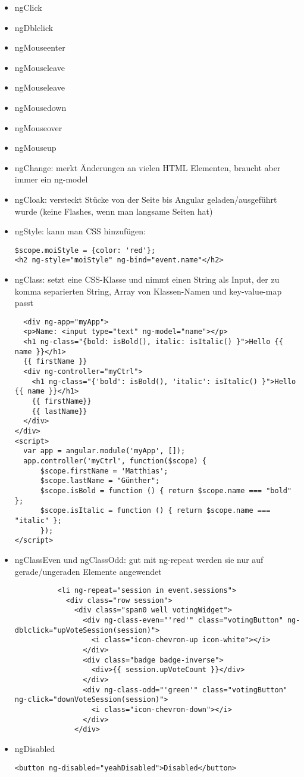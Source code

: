 \begin{itemize}
  \item ngClick
  \item ngDblclick
  \item ngMouseenter
  \item ngMouseleave
  \item ngMouseleave
  \item ngMousedown
  \item ngMouseover
  \item ngMouseup
  \item ngChange: merkt Änderungen an vielen HTML Elementen, braucht aber immer ein ng-model
  \item ngCloak: versteckt Stücke von der Seite bis Angular geladen/ausgeführt wurde (keine Flashes,
    wenn man langsame Seiten hat)
  \item ngStyle: kann man CSS hinzufügen:
    \begin{verbatim}
$scope.moiStyle = {color: 'red'};
<h2 ng-style="moiStyle" ng-bind="event.name"</h2>
    \end{verbatim}
  \item ngClass: setzt eine CSS-Klasse und nimmt einen String als Input, der zu komma separierten String, Array von Klassen-Namen  und key-value-map passt
  \begin{verbatim}
  <div ng-app="myApp">
  <p>Name: <input type="text" ng-model="name"></p>
  <h1 ng-class="{bold: isBold(), italic: isItalic() }">Hello {{ name }}</h1>
  {{ firstName }}
  <div ng-controller="myCtrl">
    <h1 ng-class="{'bold': isBold(), 'italic': isItalic() }">Hello {{ name }}</h1>
    {{ firstName}}
    {{ lastName}}
  </div>
</div>
<script>
  var app = angular.module('myApp', []);
  app.controller('myCtrl', function($scope) {
      $scope.firstName = 'Matthias';
      $scope.lastName = "Günther";
      $scope.isBold = function () { return $scope.name === "bold" };
      $scope.isItalic = function () { return $scope.name === "italic" };
      });
</script>

  \end{verbatim}

  \item ngClassEven und ngClassOdd: gut mit ng-repeat werden sie nur auf gerade/ungeraden Elemente angewendet
    \begin{verbatim}
          <li ng-repeat="session in event.sessions">
            <div class="row session">
              <div class="span0 well votingWidget">
                <div ng-class-even="'red'" class="votingButton" ng-dblclick="upVoteSession(session)">
                  <i class="icon-chevron-up icon-white"></i>
                </div>
                <div class="badge badge-inverse">
                  <div>{{ session.upVoteCount }}</div>
                </div>
                <div ng-class-odd="'green'" class="votingButton" ng-click="downVoteSession(session)">
                  <i class="icon-chevron-down"></i>
                </div>
              </div>
    \end{verbatim}
  \item ngDisabled
    \begin{verbatim}
<button ng-disabled="yeahDisabled">Disabled</button>


\end{verbatim}
\end{itemize}
